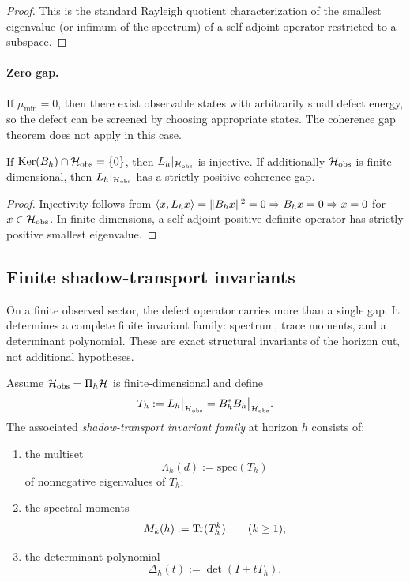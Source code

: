 \begin{proof}
This is the standard Rayleigh quotient characterization of the smallest eigenvalue (or infimum of the spectrum) of a self-adjoint operator restricted to a subspace.
\end{proof}

\paragraph{Zero gap.}
If $\mu_{\min} = 0$, then there exist observable states with arbitrarily small
defect energy, so the defect can be screened by choosing appropriate states.
The coherence gap theorem does not apply in this case.

\begin{corollary}
\label{cor:kernel-gap}
If $\Ker(\CCLeak{d}{h}) \cap \cH_{\mathrm{obs}} = \{0\}$, then $\CCDefOp{d}{h}|_{\cH_{\mathrm{obs}}}$ is injective.
If additionally $\cH_{\mathrm{obs}}$ is finite-dimensional, then $\CCDefOp{d}{h}|_{\cH_{\mathrm{obs}}}$ has a strictly positive coherence gap.
\end{corollary}

\begin{proof}
Injectivity follows from $\langle x, \CCDefOp{d}{h} x \rangle = \|\CCLeak{d}{h} x\|^2 = 0 \Rightarrow \CCLeak{d}{h} x = 0 \Rightarrow x = 0$ for $x \in \cH_{\mathrm{obs}}$.
In finite dimensions, a self-adjoint positive definite operator has strictly positive smallest eigenvalue.
\end{proof}

\subsection{Finite shadow-transport invariants}

On a finite observed sector, the defect operator carries more than a single gap.
It determines a complete finite invariant family: spectrum, trace moments, and a
determinant polynomial. These are exact structural invariants of the horizon
cut, not additional hypotheses.

\begin{definition}
\label{def:shadow-transport-invariants}
Assume $\cH_{\mathrm{obs}}=\CCPi{h}\cH$ is finite-dimensional and define
\[
T_h := \CCDefOp{d}{h}\big|_{\cH_{\mathrm{obs}}}
=
\CCLeak{d}{h}^* \CCLeak{d}{h}\big|_{\cH_{\mathrm{obs}}}.
\]
The associated \emph{shadow-transport invariant family} at horizon $h$ consists
of:
\begin{enumerate}[label=(\roman*), itemsep=0.2em]
\item the multiset
      \[
      \Lambda_h(d):=\mathrm{spec}(T_h)
      \]
      of nonnegative eigenvalues of $T_h$;
\item the spectral moments
      \[
      M_k(h):=\Tr(T_h^k)
      \qquad (k\ge 1);
      \]
\item the determinant polynomial
      \[
      \Delta_h(t):=\det(I+tT_h).
      \]
\end{enumerate}
\end{definition}

